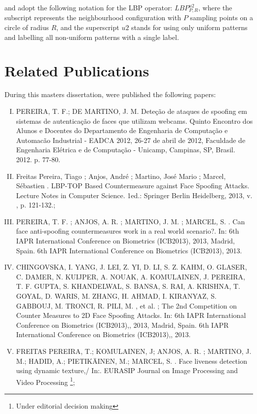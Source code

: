 \begin{appendices}
\cite{ahonen2004face} and \cite{ahonen2006face} adopt the following notation for the LBP operator: $LBP_{P,R}^{u2}$, where the subscript represents the neighbourhood configuration with $P$ sampling points on a circle of radius $R$, and the superscript $u2$ stands for using only uniform patterns and labelling all non-uniform patterns with a single label.


\chapter{Related Publications}
\label{AppendixB}

During this masters dissertation, were published the following papers:

\begin{enumerate}[I.]
	\item PEREIRA, T. F.; DE MARTINO, J. M. Dete\c{c}\~ao de ataques de spoofing em sistemas de autentica\c{c}\~ao de faces que utilizam webcams. Quinto Encontro dos Alunos e Docentes do Departamento de Engenharia de Computa\c{c}\~ao e Automac\~ao Industrial - EADCA 2012, 26-27 de abril de 2012, Faculdade de Engenharia El\'etrica e de Computa\c{c}\~ao - Unicamp, Campinas, SP, Brasil. 2012. p. 77-80.

	\item Freitas Pereira, Tiago ; Anjos, Andr\'e ; Martino, Jos\'e Mario ; Marcel, S\'ebastien . LBP-TOP Based Countermeasure against Face Spoofing Attacks. Lecture Notes in Computer Science. 1ed.: Springer Berlin Heidelberg, 2013, v. , p. 121-132.;

	\item PEREIRA, T. F. ; ANJOS, A. R. ; MARTINO, J. M. ; MARCEL, S. . Can face anti-spoofing countermeasures work in a real world scenario?. In: 6th IAPR International Conference on Biometrics (ICB2013), 2013, Madrid, Spain. 6th IAPR International Conference on Biometrics (ICB2013), 2013.

	\item CHINGOVSKA, I. YANG, J. LEI, Z. YI, D. LI, S. Z. KAHM, O. GLASER, C. DAMER, N. KUIJPER, A. NOUAK, A. KOMULAINEN, J. PEREIRA, T. F. GUPTA, S. KHANDELWAL, S. BANSA, S. RAI, A. KRISHNA, T. GOYAL, D. WARIS, M. ZHANG, H. AHMAD, I. KIRANYAZ, S. GABBOUJ, M. TRONCI, R. PILI, M. , et al. ; The 2nd Competition on Counter Measures to 2D Face Spoofing Attacks. In: 6th IAPR International Conference on Biometrics (ICB2013),, 2013, Madrid, Spain. 6th IAPR International Conference on Biometrics (ICB2013),, 2013.

	\item FREITAS PEREIRA, T.; KOMULAINEN, J; ANJOS, A. R. ; MARTINO, J. M.;  HADID, A.;  PIETIK{\"A}INEN, M.; MARCEL, S. . Face liveness detection using dynamic texture,/ In:. EURASIP Journal on Image Processing and Video Processing \footnote{Under editorial decision making};  




 
\end{enumerate}

\end{appendices}
